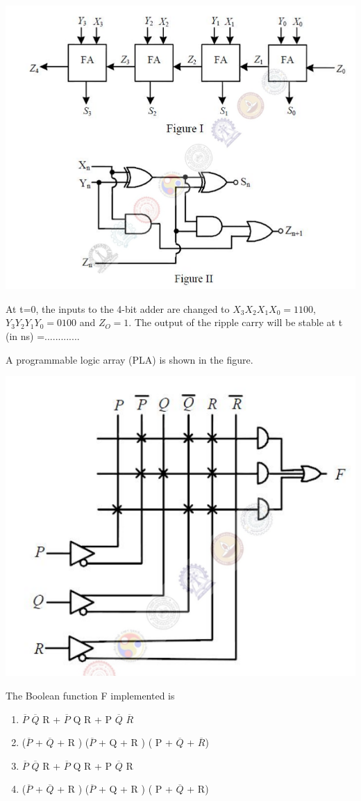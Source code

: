 \includegraphics[scale=0.3]{45}

At t=0, the inputs to the 4-bit adder are changed to $X_3X_2X_1X_0 = 1100$, $Y_3Y_2Y_1Y_0 = 0100$ and $Z_O = 1$. The output of the ripple carry will be stable at t (in ns) =.............

\item A programmable logic array (PLA) is shown in the figure.

\includegraphics[scale=0.42]{46}

The Boolean function F implemented is 
\begin{enumerate}
\item $\overline{P}$ $\overline{Q}$ R + $\overline{P}$ Q R + P $\overline{Q}$ $\overline{R}$
\item ($\overline{P}$ + $\overline{Q}$ + R ) ($\overline{P}$ + Q + R ) ( P + $\overline{Q}$ + $\overline{R}$)
\item $\overline{P}$ $\overline{Q}$ R + $\overline{P}$ Q R + P $\overline{Q}$ R
\item ($\overline{P}$ + $\overline{Q}$ + R ) ($\overline{P}$ + Q + R ) ( P + $\overline{Q}$ + R)
\end{enumerate}

